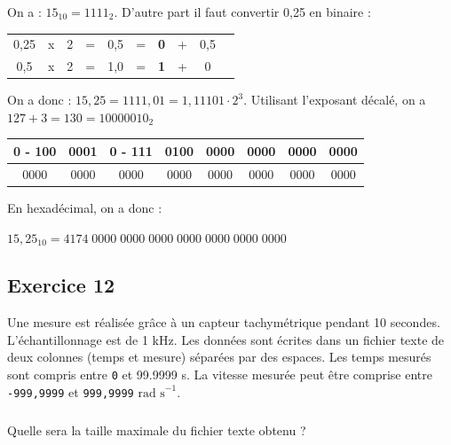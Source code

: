 \documentclass[10pt,fleqn]{article} %
\begin{document}
\begin{multicols}{2}
\begin{corrige}
On a : $15_{10}=1111_2$. D'autre part il faut convertir 0,25 en binaire : 

\begin{tabular}{cccccccccc}
0,25 & x & 2 & = & 0,5 & =& \textbf{0} & + & 0,5 \\
0,5 & x & 2 & = & 1,0 & =& \textbf{1} & + & 0 \\
\end{tabular}

On a donc : $15,25=1111,01 = 1,11101 \cdot 2^{3}$. Utilisant l'exposant décalé, on a $127+3 = 130=10000010_2$

\noindent \begin{tabular}{|c|c|c|c|c|c|c|c|}
\hline
0 - 100&0001 & 0 - 111& 0100& 0000& 0000& 0000& 0000 \\
\hline
0000 & 0000& 0000& 0000& 0000& 0000& 0000& 0000 \\
\hline
\end{tabular}

En hexadécimal, on a donc :

 $15,25_{10} =4174\; 0000\; 0000\; 0000\; 0000 \;0000 \;0000 \; 0000 $

\end{corrige}


\subsection*{Exercice 12}
\setcounter{subparagraph}{0}
Une mesure est réalisée grâce à un capteur tachymétrique pendant 10 secondes. L'échantillonnage est de 1 kHz. Les données sont écrites dans un fichier texte de deux colonnes (temps et mesure) séparées par des espaces. Les temps mesurés sont compris entre \texttt{0} et {99.9999} s. La vitesse mesurée peut être comprise entre \texttt{-999,9999} et \texttt{999,9999} $\text{rad s}^{-1}$.
\subparagraph*{}\textit{}{Quelle sera la taille maximale du fichier texte obtenu ?}

\end{multicols}
\end{document}
